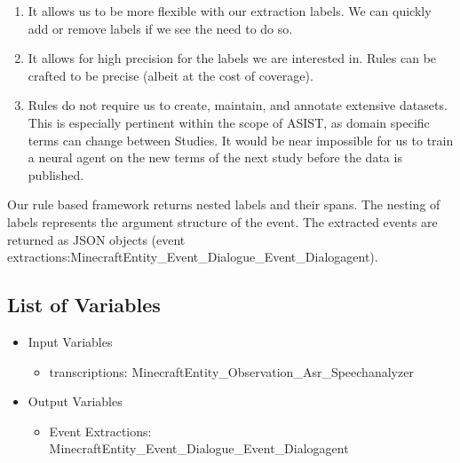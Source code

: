 \begin{enumerate}
 \item It allows us to be more flexible with our extraction labels. We can quickly add or remove labels if we see the need to do so.
 \item It allows for high precision for the labels we are interested in. Rules can be crafted to be precise (albeit at the cost of coverage).
 \item Rules do not require us to create, maintain, and annotate extensive datasets. This is especially pertinent within the scope of ASIST, as domain specific terms can change between Studies. It would be near impossible for us to train a neural agent on the new terms of the next study before the data is published.
\end{enumerate}

Our rule based framework returns nested labels and their spans. The nesting of labels represents the argument structure of the event. The extracted events are returned as JSON objects (event extractions:MinecraftEntity\_Event\_Dialogue\_Event\_Dialogagent). 



\subsection{List of Variables}
\begin{itemize}
    \item Input Variables
    \begin{itemize}
        \item transcriptions: MinecraftEntity\_Observation\_Asr\_Speechanalyzer
    \end{itemize}
    \item Output Variables
    \begin{itemize}
        \item Event Extractions: MinecraftEntity\_Event\_Dialogue\_Event\_Dialogagent
    \end{itemize}
\end{itemize}


